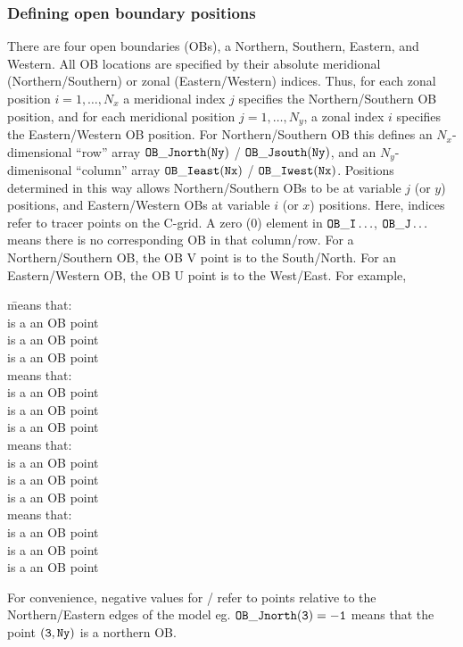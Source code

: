 
\subsubsection{Defining open boundary positions
\label{sec:pkg:obcs:defining}}

There are four open boundaries (OBs), a 
Northern, Southern, Eastern, and Western.
All OB locations are specified by their absolute
meridional (Northern/Southern) or zonal (Eastern/Western) indices.
Thus, for each zonal position $i=1,\ldots,N_x$ a meridional index
$j$ specifies the Northern/Southern OB position,
and for each meridional position $j=1,\ldots,N_y$, a zonal index
$i$ specifies the Eastern/Western OB position.
For Northern/Southern OB this defines an $N_x$-dimensional
``row'' array $\tt OB\_Jnorth(Ny)$ / $\tt OB\_Jsouth(Ny)$,
and an $N_y$-dimenisonal 
``column'' array $\tt OB\_Ieast(Nx)$ / $\tt OB\_Iwest(Nx)$.
Positions determined in this way allows Northern/Southern
OBs to be at variable $j$ (or $y$) positions, and Eastern/Western
OBs at variable $i$ (or $x$) positions.
Here, indices refer to tracer points on the C-grid.
A zero (0) element in $\tt OB\_I\ldots$, $\tt OB\_J\ldots$
means there is no corresponding OB in that column/row.
For a Northern/Southern OB, the OB V point is to the South/North.
For an Eastern/Western OB, the OB U point is to the West/East.
For example,
\begin{tabbing}
   \=  means that:  \= \\
  \>  \> is a an OB point  \\
  \>  \> is a an OB point \\
  \>  \> is a an OB point \\
   \> means that: \\
  \>  \> is a an OB point \\
  \>  \> is a an OB point \\ 
  \>  \> is a an OB point \\
   \>  means that:  \>  \\
  \>  \> is a an OB point \\
  \>  \> is a an OB point \\
  \>  \> is a an OB point \\
   \>  means that:  \>  \\
  \>  \> is a an OB point \\
  \>  \> is a an OB point \\
  \>  \> is a an OB point
\end{tabbing}
For convenience, negative values for / refer to
points relative to the Northern/Eastern edges of the model
eg. $\tt OB\_Jnorth(3)=-1$  means that the point $\tt (3,Ny)$ 
is a northern OB.

